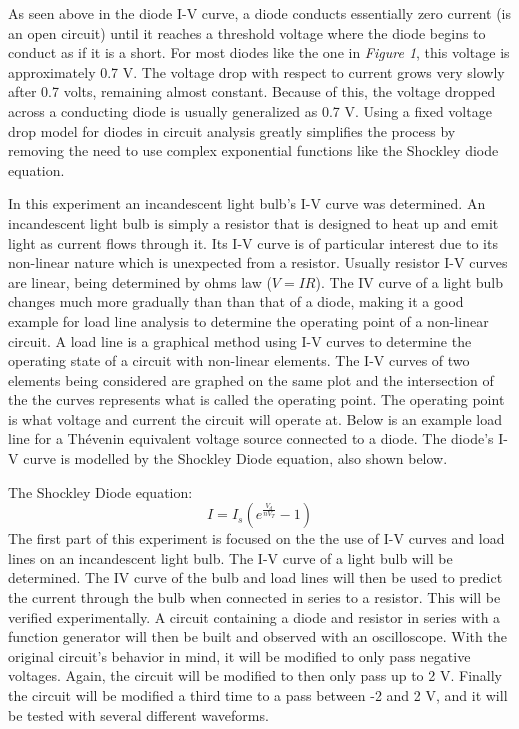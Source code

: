 \documentclass[12pt]{article}
\begin{document}
As seen above in the diode I-V curve, a diode conducts essentially zero current (is an open circuit) until it reaches a threshold voltage where the diode begins to conduct as if it is a short. For most diodes like the one in \textit{Figure 1}, this voltage is approximately 0.7 V. The voltage drop with respect to current grows very slowly after 0.7 volts, remaining almost constant. Because of this, the voltage dropped across a conducting diode is usually generalized as 0.7 V. Using a fixed voltage drop model for diodes in circuit analysis greatly simplifies the process by removing the need to use complex exponential functions like the Shockley diode equation. \\\par
%
In this experiment an incandescent light bulb's I-V curve was determined. An incandescent light bulb is simply a resistor that is designed to heat up and emit light as current flows through it. Its I-V curve is of particular interest due to its non-linear nature which is unexpected from a resistor. Usually resistor I-V curves are linear, being determined by ohms law (\(V = IR\)). The IV curve of a light bulb changes much more gradually than than that of a diode, making it a good example for load line analysis to determine the operating point of a non-linear circuit. A load line is a graphical method using I-V curves to determine the operating state of a circuit with non-linear elements. The I-V curves of two elements being considered are graphed on the same plot and the intersection of the the curves represents what is called the operating point. The operating point is what voltage and current the circuit will operate at.  Below is an example load line for a Th\'{e}venin equivalent voltage source connected to a diode. The diode's I-V curve is modelled by the Shockley Diode equation, also shown below.\par
%
\begin {figure}[htb!]
 \begin{center}
   \resizebox{0.6\textwidth}{!}{}
 \end{center}
\end {figure}
%
The Shockley Diode equation:
\begin{equation}
  I = I_s (e^{\frac{V_d}{nV_T}}-1)
\end{equation}
%
The first part of this experiment is focused on the the use of I-V curves and load lines on an incandescent light bulb. The I-V curve of a light bulb will be determined. The IV curve of the bulb and load lines will then be used to predict the current through the bulb when connected in series to a resistor. This will be verified experimentally. A circuit containing a diode and resistor in series with a function generator will then be built and observed with an oscilloscope. With the original circuit's behavior in mind, it will be modified to only pass negative voltages. Again, the circuit will be modified to then only pass up to 2 V. Finally the circuit will be modified a third time to a pass between -2 and 2 V, and it will be tested with several different waveforms.
\end{document}
